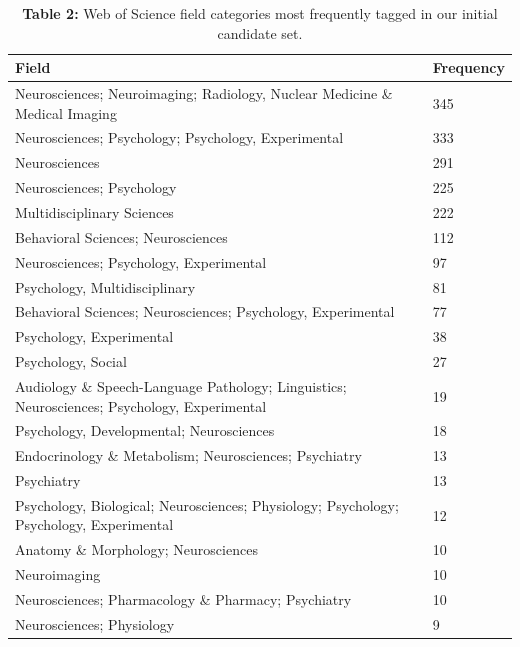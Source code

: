 \documentclass[
  man,floatsintext]{apa6}
\begin{document}
\begin{table}[tbp]

\begin{center}
\begin{threeparttable}

\caption{\label{tab:tab2}\textbf{Table 2:} Web of Science field categories most frequently tagged in our initial candidate set.}

\small{

\begin{tabular}{m{11cm}m{1.5cm}}
\toprule
Field & \multicolumn{1}{c}{Frequency}\\
\midrule
Neurosciences; Neuroimaging; Radiology, Nuclear Medicine \& Medical Imaging & 345\\
Neurosciences; Psychology; Psychology, Experimental & 333\\
Neurosciences & 291\\
Neurosciences; Psychology & 225\\
Multidisciplinary Sciences & 222\\
Behavioral Sciences; Neurosciences & 112\\
Neurosciences; Psychology, Experimental & 97\\
Psychology, Multidisciplinary & 81\\
Behavioral Sciences; Neurosciences; Psychology, Experimental & 77\\
Psychology, Experimental & 38\\
Psychology, Social & 27\\
Audiology \& Speech-Language Pathology; Linguistics; Neurosciences; Psychology, Experimental & 19\\
Psychology, Developmental; Neurosciences & 18\\
Endocrinology \& Metabolism; Neurosciences; Psychiatry & 13\\
Psychiatry & 13\\
Psychology, Biological; Neurosciences; Physiology; Psychology; Psychology, Experimental & 12\\
Anatomy \& Morphology; Neurosciences & 10\\
Neuroimaging & 10\\
Neurosciences; Pharmacology \& Pharmacy; Psychiatry & 10\\
Neurosciences; Physiology & 9\\
\bottomrule
\end{tabular}

}

\end{threeparttable}
\end{center}

\end{table}
\end{document}
